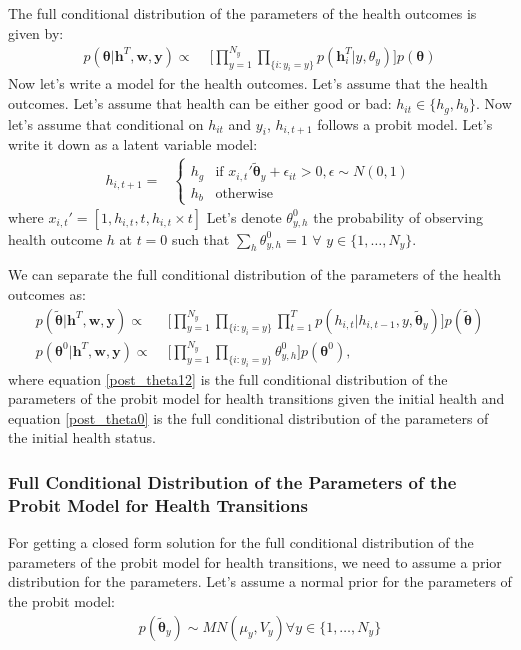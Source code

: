 \documentclass{article}
\begin{document}
The full conditional distribution of the parameters of the health outcomes is given by:
\begin{align}
    p(\bm{\theta}|\bm{h}^T,\bm{w},\bm{y})\propto\,\,& \Big[\prod_{y=1}^{N_y}\prod_{\lbrace i: y_i=y \rbrace} p(\bm{h}_i^T|y,\theta_y)\Big] p(\bm{\theta})
\end{align}
Now let's write a model for the health outcomes. Let's assume that the health outcomes. Let's assume that health can be either good or bad: $h_{it}\in\lbrace h_g,h_b\rbrace$. Now let's assume that conditional on $h_{it}$ and $y_i$, $h_{i,t+1}$ follows a probit model. Let's write it down as a latent variable model:
\begin{align}
    h_{i,t+1}=&\begin{cases}
    h_g & \text{if } x_{i,t}'\tilde{\bm{\theta}}_y+\epsilon_{it}>0, \epsilon \sim N(0,1)\\
    h_b & \text{otherwise} 
    \end{cases}
\end{align}
where $x_{i,t}'=[1,h_{i,t},t, h_{i,t} \times t]$
Let's denote $\theta^0_{y,h}$ the probability of observing health outcome $h$ at $t=0$ such that $\sum_h \theta^0_{y,h}=1\,\, \forall \,\, y\in \lbrace 1,\dots,N_y\rbrace $. 

 We can separate the full conditional distribution of the parameters of the health outcomes as:
 \begin{align}
    p(\tilde{\bm{\theta}}|\bm{h}^T,\bm{w},\bm{y})\propto\,\,& \Big[\prod_{y=1}^{N_y}\prod_{\lbrace i: y_i=y \rbrace} \prod_{t=1}^T p(h_{i,t}|h_{i,t-1},y,\tilde{\bm{\theta}}_y)\Big] p(\tilde{\bm{\theta}}) \label{post_theta12}\\
    p(\bm{\theta}^0|\bm{h}^T,\bm{w},\bm{y})\propto\,\,& \Big[\prod_{y=1}^{N_y}\prod_{\lbrace i: y_i=y \rbrace} \theta^0_{y,h}\Big] p(\bm{\theta}^0) \label{post_theta0},
 \end{align}
 where equation \ref{post_theta12} is the full conditional distribution of the parameters of the probit model for health transitions given the initial health and equation \ref{post_theta0} is the full conditional distribution of the parameters of the initial health status.
\subsubsection{Full Conditional Distribution of the Parameters of the Probit Model for Health Transitions}
For getting a closed form solution for the full conditional distribution of the parameters of the probit model for health transitions, we need to assume a prior distribution for the parameters. Let's assume a normal prior for the parameters of the probit model:
\begin{align*}
    p(\tilde{\bm{\theta}}_y)\sim MN(\mu_y,V_y) \forall y\in \lbrace 1,\dots,N_y\rbrace
\end{align*}
\end{document}
